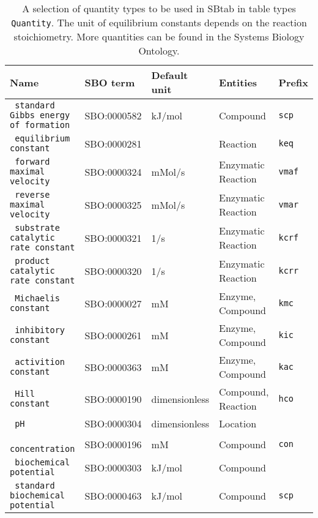 \documentclass[a4paper]{article}
\newcommand{\tab}[1]{{\texttt{\color{red} #1}}}
\newcommand{\defext}[1] {\texttt{\color{lightblue} #1}}
\begin{document}
\begin{appendix}
\begin{table}[h!]
  \begin{center} \small
    \begin{tabular}{|l|l|l|l|l|}
      \hline
      Name & SBO term & Default unit & Entities & Prefix \\
      \hline
      \defext{standard Gibbs energy of formation} &  SBO:0000582  & kJ/mol & Compound & \texttt{scp}\\
      \defext{equilibrium constant}       &  SBO:0000281  &           & Reaction & \texttt{keq} \\
      \defext{forward maximal velocity}   &  SBO:0000324            & mMol/s & Enzymatic Reaction & \texttt{vmaf} \\
      \defext{reverse maximal velocity}  & SBO:0000325  & mMol/s& Enzymatic Reaction & \texttt{vmar} \\
      \defext{substrate catalytic rate constant}      & SBO:0000321     & 1/s       & Enzymatic Reaction & \texttt{kcrf} \\
      \defext{product catalytic rate constant}     & SBO:0000320 & 1/s      & Enzymatic Reaction & \texttt{kcrr} \\
      \defext{Michaelis constant}         &  SBO:0000027  & mM    & Enzyme, Compound & \texttt{kmc} \\
      \defext{inhibitory constant}        &  SBO:0000261 & mM       & Enzyme, Compound & \texttt{kic} \\
      \defext{activition constant}        &  SBO:0000363  & mM       & Enzyme, Compound & \texttt{kac} \\
      \defext{Hill constant}              &  SBO:0000190  & dimensionless   & Compound, Reaction & \texttt{hco} \\ 
      \hline                                             
      \defext{pH}                           &  SBO:0000304  & dimensionless & Location  &  \\
      \defext{concentration}                &  SBO:0000196  & mM       & Compound  & \texttt{con} \\
      \defext{biochemical potential}           & SBO:0000303 & kJ/mol   & Compound &  \\
      \defext{standard biochemical potential}           & SBO:0000463 & kJ/mol   & Compound & \texttt{scp} \\
      \hline
    \end{tabular}
  \end{center}
  \caption{A selection of quantity types to be used in SBtab in table types 
    \tab{Quantity}.
    The unit of  equilibrium constants depends on the reaction stoichiometry. 
    More quantities can be found in the Systems Biology Ontology.}
\label{tab:quantities}
\end{table}


\end{appendix}
\end{document}
